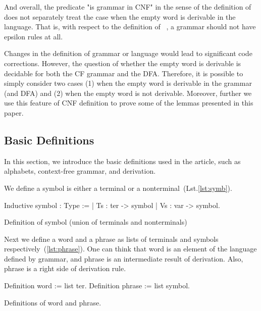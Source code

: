 And overall, the predicate "is grammar in CNF" in the sense of the definition of ~\cite{smolkaHofmann2016} does not separately treat the case when the empty word is derivable in the language. That is, with respect to the definition of ~\cite{smolkaHofmann2016}, a grammar should not have epsilon rules at all.

Changes in the definition of grammar or language would lead to significant code corrections. However, the question of whether the empty word is derivable is decidable for both the CF grammar and the DFA. Therefore, it is possible to simply consider two cases (1) when the empty word is derivable in the grammar (and DFA) and (2) when the empty word is not derivable. Moreover, further we use this feature of CNF definition to prove some of the lemmas presented in this paper.

\subsection{Basic Definitions}

In this section, we introduce the basic definitions used in the article, such as alphabets, context-free grammar, and derivation.

We define a symbol is either a terminal or a nonterminal~(Lst.\ref{lst:symb}).

\begin{listing}[h]
    \begin{pyglist}[language=coq, numbers=none, numbersep=5pt]
  Inductive symbol : Type :=
    | Ts : ter -> symbol
    | Vs : var -> symbol.
    \end{pyglist}
    \caption{Definition of symbol (union of terminals and nonterminals)}
    \label{lst:symb}
\end{listing}

Next we define a word and a phrase as lists of terminals and symbols respectively~(\ref{lst:phrase}).
One can think that word is an element of the language defined by grammar, and phrase is an intermediate result of derivation.
Also, phrase is a right side of derivation rule.

\begin{listing}[h]
    \begin{pyglist}[language=coq, numbers=none, numbersep=5pt]
  Definition word := list ter.
  Definition phrase := list symbol.
    \end{pyglist}
    \caption{Definitions of word and phrase.}
    \label{lst:phrase}
\end{listing}

